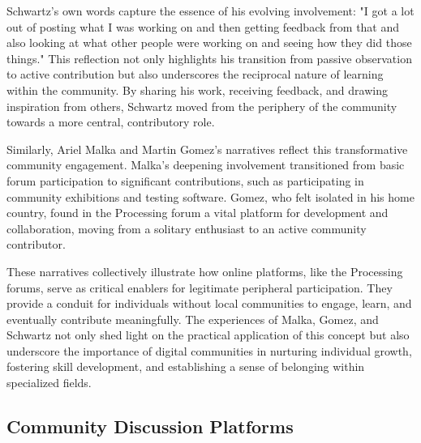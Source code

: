 Schwartz’s own words capture the essence of his evolving involvement: "I got a lot out of posting what I was working on and then getting feedback from that and also looking at what other people were working on and seeing how they did those things." This reflection not only highlights his transition from passive observation to active contribution but also underscores the reciprocal nature of learning within the community. By sharing his work, receiving feedback, and drawing inspiration from others, Schwartz moved from the periphery of the community towards a more central, contributory role.

Similarly, Ariel Malka and Martin Gomez’s narratives reflect this transformative community engagement. Malka’s deepening involvement transitioned from basic forum participation to significant contributions, such as participating in community exhibitions and testing software. Gomez, who felt isolated in his home country, found in the Processing forum a vital platform for development and collaboration, moving from a solitary enthusiast to an active community contributor.

These narratives collectively illustrate how online platforms, like the Processing forums, serve as critical enablers for legitimate peripheral participation. They provide a conduit for individuals without local communities to engage, learn, and eventually contribute meaningfully. The experiences of Malka, Gomez, and Schwartz not only shed light on the practical application of this concept but also underscore the importance of digital communities in nurturing individual growth, fostering skill development, and establishing a sense of belonging within specialized fields.

\subsection{Community Discussion Platforms}


%
%
%
%




